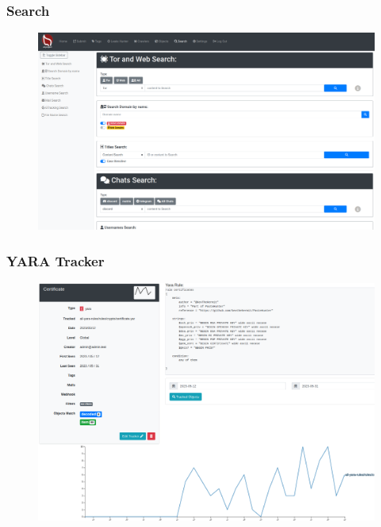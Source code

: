 \documentclass[10pt,aspectratio=169, colorlinks=true, linkcolor=circlBlue]{beamer}
\begin{document}
\begin{frame}
    \frametitle{Search}
    \begin{figure}
        \includegraphics[scale=0.18, angle=0]{screenshot/search.png}
    \end{figure}
\end{frame}

\begin{frame}
    \frametitle{YARA Tracker}
        \begin{figure}
            \includegraphics[scale=0.22]{screenshot/tracker_yara.png}
        \end{figure}
\end{frame}
\end{document}
